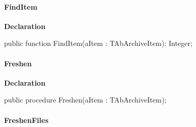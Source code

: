 \documentclass{report}
\newif\ifpdf
\begin{document}
\paragraph*{FindItem}\hspace*{\fill}

\label{AbArcTyp.TAbArchive-FindItem}
\begin{list}{}{
\setlength{\itemindent}{0cm}
\setlength{\listparindent}{0cm}
\setlength{\leftmargin}{\evensidemargin}
\addtolength{\leftmargin}{\tmplength}
\settowidth{\labelsep}{X}
\addtolength{\leftmargin}{\labelsep}
\setlength{\labelwidth}{\tmplength}
}
\item[\textbf{Declaration}\hfill]
\ifpdf
\begin{flushleft}
\fi
\begin{ttfamily}
public function FindItem(aItem : TAbArchiveItem): Integer;\end{ttfamily}

\ifpdf
\end{flushleft}
\fi

\end{list}
\paragraph*{Freshen}\hspace*{\fill}

\label{AbArcTyp.TAbArchive-Freshen}
\begin{list}{}{
\setlength{\itemindent}{0cm}
\setlength{\listparindent}{0cm}
\setlength{\leftmargin}{\evensidemargin}
\addtolength{\leftmargin}{\tmplength}
\settowidth{\labelsep}{X}
\addtolength{\leftmargin}{\labelsep}
\setlength{\labelwidth}{\tmplength}
}
\item[\textbf{Declaration}\hfill]
\ifpdf
\begin{flushleft}
\fi
\begin{ttfamily}
public procedure Freshen(aItem : TAbArchiveItem);\end{ttfamily}

\ifpdf
\end{flushleft}
\fi

\end{list}
\paragraph*{FreshenFiles}\hspace*{\fill}
\end{document}
